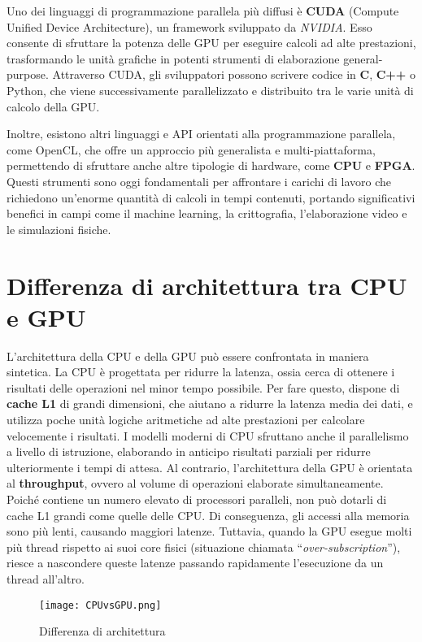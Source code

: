 \documentclass[12pt,a4paper]{report}
\begin{document}
Uno dei linguaggi di programmazione parallela più diffusi è \textbf{CUDA} (Compute Unified Device Architecture), un framework sviluppato da \textit{NVIDIA}.    Esso consente di sfruttare la potenza delle GPU per eseguire calcoli ad alte prestazioni, trasformando le unità grafiche in potenti strumenti di elaborazione general-purpose. Attraverso CUDA, gli sviluppatori possono scrivere codice in \textbf{C}, \textbf{C++} o Python, che viene successivamente parallelizzato e distribuito tra le varie unità di calcolo della GPU.

Inoltre, esistono altri linguaggi e API orientati alla programmazione parallela, come OpenCL, che offre un approccio più generalista e multi-piattaforma, permettendo di sfruttare anche altre tipologie di hardware, come \textbf{CPU} e \textbf{FPGA}. Questi strumenti sono oggi fondamentali per affrontare i carichi di lavoro che richiedono un’enorme quantità di calcoli in tempi contenuti, portando significativi benefici in campi come il machine learning, la crittografia, l’elaborazione video e le simulazioni fisiche.

\section{Differenza di architettura tra CPU e GPU}

L'architettura della CPU e della GPU può essere confrontata in maniera sintetica. La CPU è progettata per ridurre la latenza, ossia cerca di ottenere i risultati delle operazioni nel minor tempo possibile. Per fare questo, dispone di \textbf{cache L1} di grandi dimensioni, che aiutano a ridurre la latenza media dei dati, e utilizza poche unità logiche aritmetiche ad alte prestazioni per calcolare velocemente i risultati. I modelli moderni di CPU sfruttano anche il parallelismo a livello di istruzione, elaborando in anticipo risultati parziali per ridurre ulteriormente i tempi di attesa. Al contrario, l'architettura della GPU è orientata al \textbf{throughput}, ovvero al volume di operazioni elaborate simultaneamente. Poiché contiene un numero elevato di processori paralleli, non può dotarli di cache L1 grandi come quelle delle CPU. Di conseguenza, gli accessi alla memoria sono più lenti, causando maggiori latenze. Tuttavia, quando la GPU esegue molti più thread rispetto ai suoi core fisici (situazione chiamata “\textit{over-subscription}”), riesce a nascondere queste latenze passando rapidamente l'esecuzione da un thread all'altro.


\begin{figure}[h]
    \texttt{[image: CPUvsGPU.png]}
    \caption{Differenza di architettura \cite{CUDAtutorial}}
\end{figure}
\end{document}
